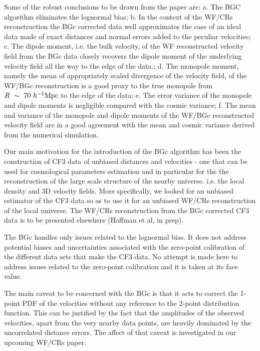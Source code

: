 \documentclass[useAMS,usenatbib]{mn2e}
\newcommand{\hmpc}{{\ifmmode{h^{-1}{\rm Mpc}}\else{$h^{-1}$Mpc}\fi}}
\begin{document}
 
 Some of the robust conclusions to be drawn from the paper are: a. The BGC algorithm eliminates the lognormal bias; b. In the context of the WF/CRs reconstruction the BGc corrected data well approximates the case of an ideal data made  of  exact distances and  normal errors added to the peculiar velocities; c. The dipole moment, i.e. the bulk velocity, of the WF reconstructed velocity field from the BGc data closely recovers the dipole moment of the underlying velocity field all the way to the edge of the data.; d. The monopole moment, namely the mean of appropriately scaled divergence of the velocity field, of the WF/BGc reconstruction  is a good proxy to the true monopole    from $R\ \sim\ 70\ \hmpc$ to the edge of the data; e. The error variance of the monopole and dipole moments is  negligible compared with  the cosmic variance; f. The mean and variance of the monopole and dipole moments of the WF/BGc reconstructed velocity field are in a good agreement  with the mean and cosmic variance derived from the numerical simulation.

Our main motivation for the introduction of the BGc  algorithm  has been the construction of  CF3 data of unbiased distances  and velocities - one that can be used for cosmological parameters estimation and in particular for the the reconstruction of the large  scale structure of the nearby universe. i.e. the local density and 3D velocity fields.
More specifically, we looked for an unbiased estimator of the CF3 data so as  to use  it for an unbiased WF/CRs reconstruction of the local universe. The WF/CRs reconstruction from the BGc corrected CF3 data is to be presented elsewhere (Hoffman et al, in prep).

The BGc handles only issues related to the lognormal bias. It does not address potential biases and uncertainties associated with the zero-point calibration of the different data sets that make the CF3 data. No  attempt is made here to address issues related to the zero-point calibration and it is taken at its face value.

The main caveat  to be concerned with the BGc is  that it acts to correct the 1-point PDF of the velocities without  any reference to the 2-point distribution function. 
This can be justified by the fact that the amplitudes of the observed velocities,   apart from the very nearby data points, are heavily dominated by the uncorrelated distance errors.   The affect of that caveat is investigated in our  upcoming WF/CRs paper.
\end{document}
